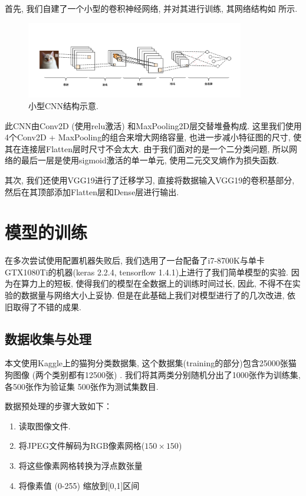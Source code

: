\documentclass[lang=cn,11pt]{elegantpaper}
\begin{document}
首先, 我们自建了一个小型的卷积神经网络, 并对其进行训练, 其网络结构如  所示. 
\begin{figure}[hbtp]
	\centering
	  \includegraphics[width=0.85\textwidth]{cnn1.png}
	  \tiny
	  \caption{小型CNN结构示意.\label{fig:cnn1}}
\end{figure}
\normalsize
此CNN由Conv2D (使用relu激活) 和MaxPooling2D层交替堆叠构成. 这里我们使用4个Conv2D + MaxPooling的组合来增大网络容量, 也进一步减小特征图的尺寸, 使其在连接层Flatten层时尺寸不会太大. 由于我们面对的是一个二分类问题, 所以网络的最后一层是使用sigmoid激活的单一单元, 使用二元交叉熵作为损失函数. 

其次, 我们还使用VGG19进行了迁移学习, 直接将数据输入VGG19的卷积基部分, 然后在其顶部添加Flatten层和Dense层进行输出. 

\section{模型的训练}

在多次尝试使用配置机器失败后, 我们选用了一台配备了i7-8700K与单卡GTX1080Ti的机器(keras 2.2.4, tensorflow 1.4.1)上进行了我们简单模型的实验. 因为在算力上的短板, 使得我们的模型在全数据上的训练时间过长, 因此, 不得不在实验的数据量与网络大小上妥协. 但是在此基础上我们对模型进行了的几次改进, 依旧取得了不错的成果. 

\subsection{数据收集与处理}
本文使用Kaggle上的猫狗分类数据集, 这个数据集(training的部分)包含25000张猫狗图像 (两个类别都有12500张) . 我们将其两类分别随机分出了1000张作为训练集, 各500张作为验证集 500张作为测试集数目.

  数据预处理的步骤大致如下：

\begin{enumerate}
	\item 读取图像文件.
	\item 将JPEG文件解码为RGB像素网格($150\times 150$)
	\item 将这些像素网格转换为浮点数张量
	\item 将像素值 (0-255) 缩放到[0,1]区间
\end{enumerate}
\end{document}
